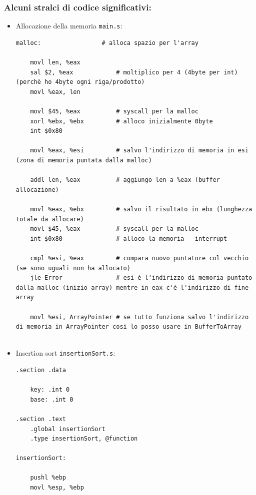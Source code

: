 \documentclass[a4paper]{report}
\begin{document}
\subsubsection{Alcuni stralci di codice significativi:}

  \begin{itemize}
    \item Allocazione della memoria \texttt{main.s}:
    \begin{lstlisting}[firstnumber=130]
    malloc:                 # alloca spazio per l'array

    movl len, %eax
    sal $2, %eax            # moltiplico per 4 (4byte per int) (perchè ho 4byte ogni riga/prodotto)     
    movl %eax, len

    movl $45, %eax          # syscall per la malloc
    xorl %ebx, %ebx         # alloco inizialmente 0byte
    int $0x80   
    
    movl %eax, %esi         # salvo l'indirizzo di memoria in esi (zona di memoria puntata dalla malloc)
    
    addl len, %eax          # aggiungo len a %eax (buffer allocazione)
                                                              
    movl %eax, %ebx         # salvo il risultato in ebx (lunghezza totale da allocare)
    movl $45, %eax          # syscall per la malloc
    int $0x80               # alloco la memoria - interrupt
    
    cmpl %esi, %eax         # compara nuovo puntatore col vecchio (se sono uguali non ha allocato)
    jle Error               # esi è l'indirizzo di memoria puntato dalla malloc (inizio array) mentre in eax c'è l'indirizzo di fine array
    
    movl %esi, ArrayPointer # se tutto funziona salvo l'indirizzo di memoria in ArrayPointer cosi lo posso usare in BufferToArray
    
    \end{lstlisting}
    
    \item Insertion sort \texttt{insertionSort.s}:
    \begin{lstlisting}[firstnumber=1]
  .section .data

    key: .int 0
    base: .int 0

.section .text 
    .global insertionSort
    .type insertionSort, @function

insertionSort:

    pushl %ebp
    movl %esp, %ebp


\end{lstlisting}
\end{itemize}
\end{document}
